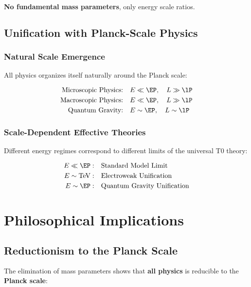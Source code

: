 	\textbf{No fundamental mass parameters}, only energy scale ratios.
	
	\subsection{Unification with Planck-Scale Physics}
	\label{subsec:planck_unification}
	
	\subsubsection{Natural Scale Emergence}
	
	All physics organizes itself naturally around the Planck scale:
	
	\begin{align}
		\text{Microscopic Physics:} \quad &E \ll \EP, \quad L \gg \lP \\
		\text{Macroscopic Physics:} \quad &E \ll \EP, \quad L \gg \lP \\
		\text{Quantum Gravity:} \quad &E \sim \EP, \quad L \sim \lP
	\end{align}
	
	\subsubsection{Scale-Dependent Effective Theories}
	
	Different energy regimes correspond to different limits of the universal T0 theory:
	
	\begin{align}
		E \ll \EP: \quad &\text{Standard Model Limit} \\
		E \sim \text{TeV}: \quad &\text{Electroweak Unification} \\
		E \sim \EP: \quad &\text{Quantum Gravity Unification}
	\end{align}
	
	\section{Philosophical Implications}
	\label{sec:philosophical}
	
	\subsection{Reductionism to the Planck Scale}
	\label{subsec:reductionism}
	
	The elimination of mass parameters shows that \textbf{all physics} is reducible to the \textbf{Planck scale}:
	
